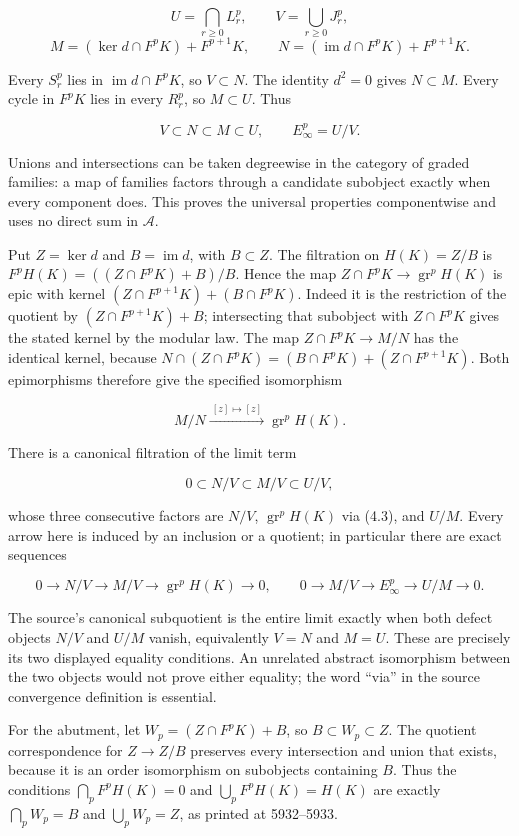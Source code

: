 \[
U=\bigcap_{r\geq0}L_r^p,\qquad V=\bigcup_{r\geq0}J_r^p,
\] \[
M=(\ker d\cap F^pK)+F^{p+1}K,\qquad
N=(\operatorname{im}d\cap F^pK)+F^{p+1}K.       \tag{4.1}
\]

Every \(S_r^p\) lies in \(\operatorname{im}d\cap F^pK\), so \(V\subset N\). The identity \(d^2=0\) gives \(N\subset M\). Every cycle in \(F^pK\) lies in every \(R_r^p\), so \(M\subset U\). Thus

\[
V\subset N\subset M\subset U,\qquad E_\infty^p=U/V.       \tag{4.2}
\]

Unions and intersections can be taken degreewise in the category of graded families: a map of families factors through a candidate subobject exactly when every component does. This proves the universal properties componentwise and uses no direct sum in \(\mathcal A\).

Put \(Z=\ker d\) and \(B=\operatorname{im}d\), with \(B\subset Z\). The filtration on \(H(K)=Z/B\) is \(F^pH(K)=((Z\cap F^pK)+B)/B\). Hence the map \(Z\cap F^pK\to\operatorname{gr}^pH(K)\) is epic with kernel \((Z\cap F^{p+1}K)+(B\cap F^pK)\). Indeed it is the restriction of the quotient by \((Z\cap F^{p+1}K)+B\); intersecting that subobject with \(Z\cap F^pK\) gives the stated kernel by the modular law. The map \(Z\cap F^pK\to M/N\) has the identical kernel, because \(N\cap(Z\cap F^pK)=(B\cap F^pK)+(Z\cap F^{p+1}K)\). Both epimorphisms therefore give the specified isomorphism

\[
M/N\xrightarrow{\ [z]\mapsto[z]\ }
\operatorname{gr}^pH(K).                  \tag{4.3}
\]

There is a canonical filtration of the limit term

\[
0\subset N/V\subset M/V\subset U/V,
\]

whose three consecutive factors are \(N/V\), \(\operatorname{gr}^pH(K)\) via (4.3), and \(U/M\). Every arrow here is induced by an inclusion or a quotient; in particular there are exact sequences

\[
0\to N/V\to M/V\to\operatorname{gr}^pH(K)\to0,
\qquad
0\to M/V\to E_\infty^p\to U/M\to0.          \tag{4.4}
\]

The source's canonical subquotient is the entire limit exactly when both defect objects \(N/V\) and \(U/M\) vanish, equivalently \(V=N\) and \(M=U\). These are precisely its two displayed equality conditions. An unrelated abstract isomorphism between the two objects would not prove either equality; the word ``via'' in the source convergence definition is essential.

For the abutment, let \(W_p=(Z\cap F^pK)+B\), so \(B\subset W_p\subset Z\). The quotient correspondence for \(Z\to Z/B\) preserves every intersection and union that exists, because it is an order isomorphism on subobjects containing \(B\). Thus the conditions \(\bigcap_pF^pH(K)=0\) and \(\bigcup_pF^pH(K)=H(K)\) are exactly \(\bigcap_pW_p=B\) and \(\bigcup_pW_p=Z\), as printed at 5932--5933.

